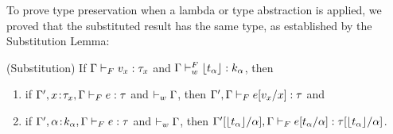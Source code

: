 %
To prove type preservation when
a lambda or type abstraction is applied, 
we proved that the substituted result 
has the same type, as established by 
the Substitution Lemma:
%
\begin{lemma}(Substitution)\label{lem:substitutionFF}
If $\hasftype{\tcenv}{\sval_x}{\sftype_x}$ 
and $\isWFFT{\tcenv}{\forgetreft{\stype_{\al}}}{k_{\al}}$, then 
\begin{enumerate}
\item if\; $\hasftype{\tcenv', \bind{x}{\sftype_x}, \tcenv}{\sexpr}{\sftype}$
    and\; $\isWFFE{\tcenv}$, then
    ${\hasftype{\tcenv', \tcenv}{\subst{\sexpr}{x}{\sval_x}}{\sftype}}$ and 
\item if\; $\hasftype{\tcenv', \bind{\al}{k_{\al}}, \tcenv}{\sexpr}{\sftype}$
    and\; $\isWFFE{\tcenv}$, then
    ${\hasftype{\subst{\tcenv'}{\al}{\forgetreft{\stype_{\al}}}, \tcenv}
               {\subst{\sexpr}{\al}{\stype_{\al}}}
               {\subst{\sftype}{\al}{\forgetreft{\stype_{\al}}}}}$.
\end{enumerate}
\end{lemma}
